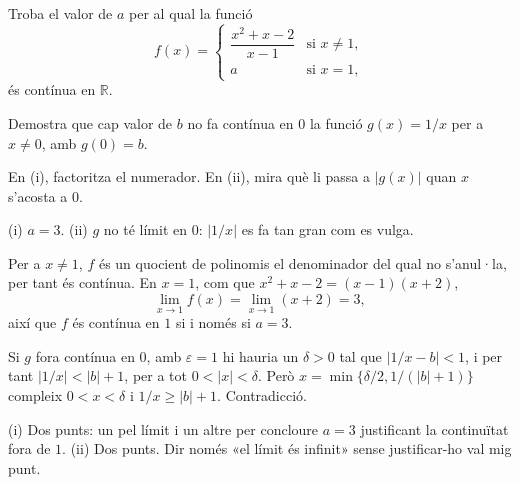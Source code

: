 
\begin{exercise}
\begin{parts}
  \item Troba el valor de $a$ per al qual la funció
        \[
          f(x) =
          \begin{cases}
            \dfrac{x^2 + x - 2}{x - 1} & \text{si } x \neq 1, \\[1ex]
            a & \text{si } x = 1,
          \end{cases}
        \]
        és contínua en $\mathbb{R}$.
  \item Demostra que cap valor de $b$ no fa contínua en $0$ la funció
        $g(x) = 1/x$ per a $x \neq 0$, amb $g(0) = b$.
\end{parts}

\answerspace{6cm}

\begin{hint}
En (i), factoritza el numerador. En (ii), mira què li passa a $|g(x)|$ quan
$x$ s'acosta a $0$.
\end{hint}

\begin{answer}
(i) $a = 3$. (ii) $g$ no té límit en $0$: $|1/x|$ es fa tan gran com es
vulga.
\end{answer}

\begin{solution}
\begin{parts}
  \item Per a $x \neq 1$, $f$ és un quocient de polinomis el denominador del
        qual no s'anul·la, per tant és contínua. En $x = 1$, com que
        $x^2 + x - 2 = (x - 1)(x + 2)$,
        \[
          \lim_{x \to 1} f(x) = \lim_{x \to 1} (x + 2) = 3 ,
        \]
        així que $f$ és contínua en $1$ si i només si $a = 3$.
  \item Si $g$ fora contínua en $0$, amb $\varepsilon = 1$ hi hauria un
        $\delta > 0$ tal que $|1/x - b| < 1$, i per tant
        $|1/x| < |b| + 1$, per a tot $0 < |x| < \delta$. Però
        $x = \min\{\delta/2, 1/(|b| + 1)\}$ compleix $0 < x < \delta$ i
        $1/x \geq |b| + 1$. Contradicció.
\end{parts}
\end{solution}

\begin{marking}
(i) Dos punts: un pel límit i un altre per concloure $a = 3$ justificant la
continuïtat fora de $1$. (ii) Dos punts. Dir només «el límit és infinit»
sense justificar-ho val mig punt.
\end{marking}
\end{exercise}
